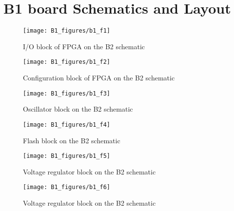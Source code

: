 \chapter{B1 board Schematics and Layout}

\begin{figure}
 \centering
 \texttt{[image: B1\_figures/b1\_f1]}
 \caption{I/O block of FPGA on the B2 schematic}
 \label{fig:b1_sch_1}
\end{figure}

\begin{figure}
 \centering
 \texttt{[image: B1\_figures/b1\_f2]}
 \caption{Configuration block of FPGA on the B2 schematic}
 \label{fig:b1_sch_2}
\end{figure}

\begin{figure}
 \centering
 \texttt{[image: B1\_figures/b1\_f3]}
 \caption{Oscillator block on the B2 schematic}
 \label{fig:b1_sch_3}
\end{figure}

\begin{figure}
 \centering
 \texttt{[image: B1\_figures/b1\_f4]}
 \caption{Flash block on the B2 schematic}
 \label{fig:b1_sch_4}
\end{figure}

\begin{figure}
 \centering
 \texttt{[image: B1\_figures/b1\_f5]}
 \caption{Voltage regulator block on the B2 schematic}
 \label{fig:b1_sch_5}
\end{figure}

\begin{figure}
 \centering
 \texttt{[image: B1\_figures/b1\_f6]}
 \caption{Voltage regulator block on the B2 schematic}
 \label{fig:b1_sch_6}
\end{figure}